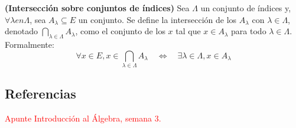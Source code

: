 \begin{definicion}
	\textbf{(Intersección sobre conjuntos de índices)}
	Sea $\Lambda$ un conjunto de índices y, $\forall \lambda en \Lambda$, sea $A_\lambda \subseteq E$ un conjunto. Se define la intersección de los $A_\lambda$ con $\lambda \in \Lambda$, denotado $\bigcap_{\lambda \in \Lambda} A_\lambda$, como el conjunto de los $x$ tal que $x \in A_\lambda$ para todo $\lambda \in \Lambda$. Formalmente: 
	$$ \forall x \in E , x\in \bigcap_{\lambda \in \Lambda} A_\lambda \quad \iff \quad \exists \lambda \in \Lambda , x \in A_\lambda$$ 
\end{definicion}

\subsection{Referencias}

\textcolor{red}{Apunte Introducción al Álgebra, semana 3. }	